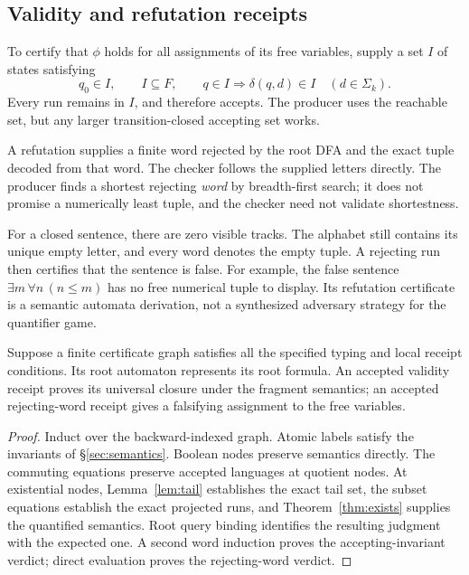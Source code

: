 \subsection{Validity and refutation receipts}
To certify that \(\phi\) holds for all assignments of its free variables, supply a set \(I\) of states satisfying
\[
 q_0\in I,\qquad I\subseteq F,\qquad
 q\in I\Longrightarrow\delta(q,d)\in I\quad(d\in\Sigma_k).
\]
Every run remains in \(I\), and therefore accepts. The producer uses the reachable set, but any larger transition-closed accepting set works.

A refutation supplies a finite word rejected by the root DFA and the exact tuple decoded from that word. The checker follows the supplied letters directly. The producer finds a shortest rejecting \emph{word} by breadth-first search; it does not promise a numerically least tuple, and the checker need not validate shortestness.

For a closed sentence, there are zero visible tracks. The alphabet still contains its unique empty letter, and every word denotes the empty tuple. A rejecting run then certifies that the sentence is false. For example, the false sentence \(\exists m\,\forall n\,(n\le m)\) has no free numerical tuple to display. Its refutation certificate is a semantic automata derivation, not a synthesized adversary strategy for the quantifier game.

\begin{theorem}\label{thm:receipt}
Suppose a finite certificate graph satisfies all the specified typing and local receipt conditions. Its root automaton represents its root formula. An accepted validity receipt proves its universal closure under the fragment semantics; an accepted rejecting-word receipt gives a falsifying assignment to the free variables.
\end{theorem}
\begin{proof}
Induct over the backward-indexed graph. Atomic labels satisfy the invariants of \S\ref{sec:semantics}. Boolean nodes preserve semantics directly. The commuting equations preserve accepted languages at quotient nodes. At existential nodes, Lemma~\ref{lem:tail} establishes the exact tail set, the subset equations establish the exact projected runs, and Theorem~\ref{thm:exists} supplies the quantified semantics. Root query binding identifies the resulting judgment with the expected one. A second word induction proves the accepting-invariant verdict; direct evaluation proves the rejecting-word verdict.
\end{proof}

